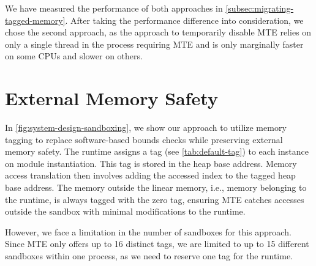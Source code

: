\noindent
We have measured the performance of both approaches in \cref{subsec:migrating-tagged-memory}.
After taking the performance difference into consideration, we chose the second approach, as the approach to temporarily disable \ac{MTE} relies on only a single thread in the process requiring \ac{MTE} and is only marginally faster on some CPUs and slower on others.

\section{External Memory Safety}
\label{sec:external-memory-safety-impl}

In \cref{fig:system-design-sandboxing}, we show our approach to utilize memory tagging to replace software-based bounds checks while preserving external memory safety.
The runtime assigns a tag (see \cref{tab:default-tag}) to each instance on module instantiation.
This tag is stored in the heap base address.
Memory access translation then involves adding the accessed index to the tagged heap base address.
The memory outside the linear memory, i.e., memory belonging to the runtime, is always tagged with the zero tag, ensuring \ac{MTE} catches accesses outside the sandbox with minimal modifications to the runtime.

However, we face a limitation in the number of sandboxes for this approach.
Since \ac{MTE} only offers up to 16 distinct tags, we are limited to up to 15 different sandboxes within one process, as we need to reserve one tag for the runtime.

